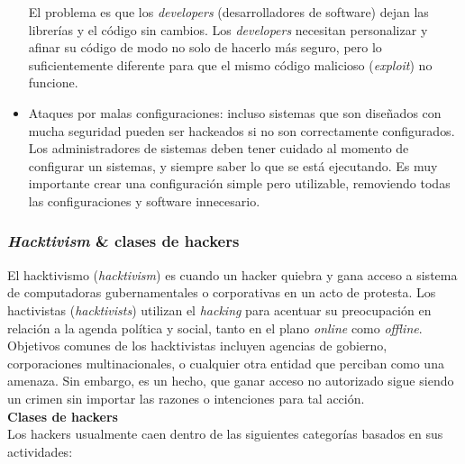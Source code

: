 \documentclass[a4paper,12pt]{report}
\begin{document}
\begin{itemize}
El problema es que los \emph{developers} (desarrolladores de software) dejan las librerías y el
código sin cambios. Los \emph{developers} necesitan personalizar y afinar su
código de modo no solo de hacerlo más seguro, pero lo suficientemente diferente
para que el mismo código malicioso (\emph{exploit}) no funcione.

\item Ataques por malas configuraciones:
incluso sistemas que son diseñados con mucha seguridad pueden ser hackeados si
no son correctamente configurados. Los administradores de sistemas deben tener
cuidado al momento de configurar un sistemas, y siempre saber lo que se está
ejecutando. Es muy importante crear una configuración simple pero utilizable,
removiendo todas las configuraciones y software innecesario.
\end{itemize}

\subsubsection{\emph{Hacktivism} \& clases de hackers}

El hacktivismo (\emph{hacktivism}) es cuando un hacker quiebra y gana acceso a
sistema de computadoras gubernamentales o corporativas en un acto de
protesta. Los hactivistas (\emph{hacktivists}) utilizan el \emph{hacking} para acentuar
su preocupación en relación a la agenda política y social, tanto en el plano
\emph{online} como \emph{offline}.
Objetivos comunes de los hacktivistas incluyen agencias de gobierno,
corporaciones multinacionales, o cualquier otra entidad que perciban como una
amenaza. Sin embargo, es un hecho, que ganar acceso no autorizado sigue siendo
un crimen sin importar las razones o intenciones para tal acción.\\

    
\textbf{Clases de hackers}\\
Los hackers usualmente caen dentro de las siguientes categorías basados en sus
actividades:
\end{document}
